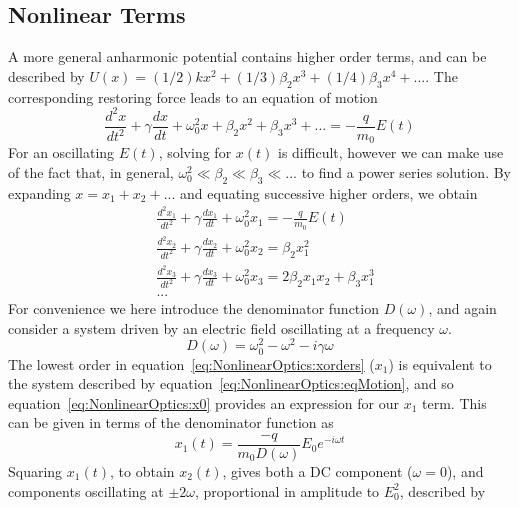\subsection{Nonlinear Terms}
A more general anharmonic potential contains higher order terms, and can be described by $U(x) = (1/2)kx^{2} + (1/3)\beta_2 x^3 + (1/4)\beta_3 x^4 + ...$. The corresponding restoring force leads to an equation of motion
\begin{equation}\label{eq:NonlinearOptics:eqMotionNonlinear}
	\frac{d^2 x}{dt^2} + \gamma \frac{dx}{dt} + \omega_{0}^2 x + \beta_2 x^2 +  \beta_3 x^3 + ... = -\frac{q}{m_{0} } E(t)
\end{equation}
For an oscillating $E(t)$, solving for $x(t)$ is difficult, however we can make use of the fact that, in general, $\omega_{0}^2 \ll \beta_2 \ll \beta_3 \ll ...$ to find a power series solution. By expanding $x = x_1 + x_2 + ...$ and equating successive higher orders, we obtain~\cite[\S 1.4.1]{Boyd2008a}
\begin{equation}\label{eq:NonlinearOptics:xorders}
	\begin{split}
		& \frac{d^2 x_1}{dt^2} + \gamma \frac{dx_1}{dt} + \omega_{0}^2 x_1 = -\frac{q}{m_{0} } E(t) \\
		& \frac{d^2 x_2}{dt^2} + \gamma \frac{dx_2}{dt} + \omega_{0}^2 x_2 = \beta_2 x_1^2 \\
		& \frac{d^2 x_3}{dt^2} + \gamma \frac{dx_3}{dt} + \omega_{0}^2 x_3 = 2\beta_2 x_1 x_2 + \beta_3 x_1^3 \\
		& ...
	\end{split}
\end{equation}
For convenience we here introduce the denominator function $D(\omega)$, and again consider a system driven by an electric field oscillating at a frequency $\omega$.
\begin{equation}
	D(\omega) = \omega_{0}^2 -\omega^2 -i \gamma \omega
\end{equation}
The lowest order in equation~\ref{eq:NonlinearOptics:xorders} ($x_{1}$) is equivalent to the system described by equation~\ref{eq:NonlinearOptics:eqMotion}, and so equation~\ref{eq:NonlinearOptics:x0} provides an expression for our $x_1$ term. This can be given in terms of the denominator function as
\begin{equation}
	x_{1}(t) = \frac{-q}{m_0 D(\omega)} E_0 e^{-i\omega t}
\end{equation}
Squaring $x_{1}(t)$, to obtain $x_{2}(t)$, gives both a DC component ($\omega=0$), and components oscillating at $\pm 2\omega$, proportional in amplitude to $E_{0}^2$, described by
